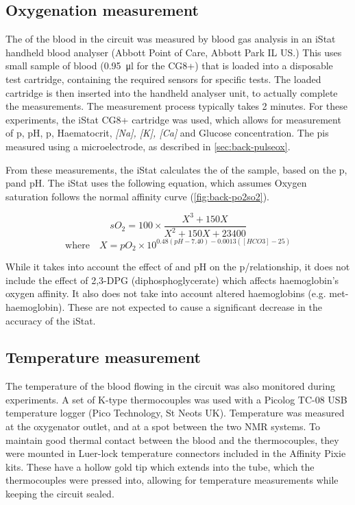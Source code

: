 \subsection{Oxygenation measurement}
The \SOtwo of the blood in the circuit was measured by blood gas analysis in an iStat handheld blood analyser (Abbott Point of Care, Abbott Park IL US.)
This uses small sample of blood (\SI{0.95}{\micro\litre} for the CG8+) that is loaded into a disposable test cartridge, containing the required sensors for specific tests.
The loaded cartridge is then inserted into the handheld analyser unit, to actually complete the measurements.
The measurement process typically takes 2 minutes.
For these experiments, the iStat CG8+ cartridge was used, which allows for measurement of p\Otwo, pH, p\COtwo, Haematocrit, \textit{[Na], [K], [Ca]} and Glucose concentration.
The p\Otwo is measured using a microelectrode, as described in \autoref{sec:back-pulseox}.

From these measurements, the iStat calculates the \SOtwo of the sample, based on the p\Otwo, p\COtwo and pH\cite{AbbottPointofCareCartridgeTestInformation2013}.
The iStat uses the following equation, which assumes Oxygen saturation follows the normal affinity curve (\autoref{fig:back-po2so2}).

\begin{displaymath}
\mathit{sO_2} = 100 \times \frac{X^3 + 150X}{X^2 + 150X + 23400}
\end{displaymath}
\begin{displaymath}
\mathrm{where } \quad X = \mathit{pO_2} \times 10^{0.48(\mathit{pH}-7.40) - 0.0013(\mathit{[HCO3]}-25)}
\end{displaymath}

While it takes into account the effect of \COtwo and pH on the p\Otwo/\SOtwo relationship, it does not include the effect of 2,3-DPG (diphosphoglycerate) which affects haemoglobin's oxygen affinity.
It also does not take into account altered haemoglobins (e.g. met-haemoglobin).
These are not expected to cause a significant decrease in the accuracy of the iStat.

\subsection{Temperature measurement}
The temperature of the blood flowing in the circuit was also monitored during experiments.
A set of K-type thermocouples was used with a Picolog TC-08 USB temperature logger (Pico Technology, St Neots UK).
Temperature was measured at the oxygenator outlet, and at a spot between the two NMR systems.
To maintain good thermal contact between the blood and the thermocouples, they were mounted in Luer-lock temperature connectors included in the Affinity Pixie kits.
These have a hollow gold tip which extends into the tube, which the thermocouples were pressed into, allowing for temperature measurements while keeping the circuit sealed.

